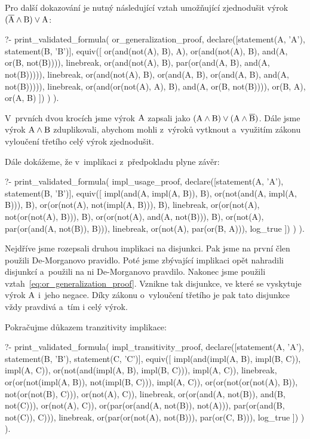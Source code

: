 Pro další dokazování je nutný následující vztah umožňující zjednodušit výrok \((\overline{\mathrm{A}} \land \mathrm{B}) \lor \mathrm{A}\):

\begin{prolog}
?- print_validated_formula(
	or_generalization_proof,
	declare([statement(A, 'A'), statement(B, 'B')],
		equiv([
			or(and(not(A), B), A),
			or(and(not(A), B), and(A, or(B, not(B)))),
			linebreak,
			or(and(not(A), B), par(or(and(A, B), and(A, not(B))))),
			linebreak,
			or(and(not(A), B), or(and(A, B), or(and(A, B), and(A, not(B))))),
			linebreak,
			or(and(or(not(A), A), B), and(A, or(B, not(B)))),
			or(B, A),
			or(A, B)
		])
	)
).
\end{prolog}

V~prvních dvou krocích jsme výrok \(\mathrm{A}\) zapsali jako \((\mathrm{A} \land \mathrm{B}) \lor (\mathrm{A} \land \overline{\mathrm{B}})\). Dále jsme výrok \(\mathrm{A} \land \mathrm{B}\) zduplikovali, abychom mohli z~výroků vytknout a~využitím zákonu vyloučení třetího celý výrok zjednodušit.

Dále dokážeme, že v~implikaci z~předpokladu plyne závěr:

\begin{prolog}
?- print_validated_formula(
	impl_usage_proof,
	declare([statement(A, 'A'), statement(B, 'B')],
		equiv([
			impl(and(A, impl(A, B)), B),
			or(not(and(A, impl(A, B))), B),
			or(or(not(A), not(impl(A, B))), B),
			linebreak,
			or(or(not(A), not(or(not(A), B))), B),
			or(or(not(A), and(A, not(B))), B),
			or(not(A), par(or(and(A, not(B)), B))),
			linebreak,
			or(not(A), par(or(B, A))),
			log_true
		])
	)
).
\end{prolog}

Nejdříve jsme rozepsali druhou implikaci na disjunkci. Pak jsme na první člen použili De-Morganovo pravidlo. Poté jsme zbývající implikaci opět nahradili disjunkcí a~použili na ni De-Morganovo pravdilo. Nakonec jsme použili vztah~\eqref{eq:or_generalization_proof}. Vznikne tak disjunkce, ve které se vyskytuje výrok 
\(\mathrm{A}\) i~jeho negace. Díky zákonu o~vyloučení třetího je pak tato disjunkce vždy pravdivá a~tím i celý výrok.

Pokračujme důkazem tranzitivity implikace:

\begin{prolog}
?- print_validated_formula(
	impl_transitivity_proof,
	declare([statement(A, 'A'), statement(B, 'B'), statement(C, 'C')],
		equiv([
			impl(and(impl(A, B), impl(B, C)), impl(A, C)),
			or(not(and(impl(A, B), impl(B, C))), impl(A, C)),
			linebreak,
			or(or(not(impl(A, B)), not(impl(B, C))), impl(A, C)),
			or(or(not(or(not(A), B)), not(or(not(B), C))), or(not(A), C)),
			linebreak,
			or(or(and(A, not(B)), and(B, not(C))), or(not(A), C)),
			or(par(or(and(A, not(B)), not(A))), par(or(and(B, not(C)), C))),
			linebreak,
			or(par(or(not(A), not(B))), par(or(C, B))),
			log_true
		])
	)
).
\end{prolog}

